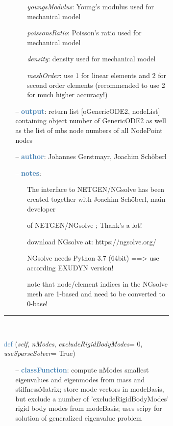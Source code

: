 \begin{itemize}[leftmargin=1.4cm]
\begin{itemize}[leftmargin=1.4cm]
\begin{itemize}[leftmargin=1.4cm]
\begin{itemize}[leftmargin=0.5cm]
\begin{itemize}[leftmargin=1.4cm]
\begin{itemize}[leftmargin=1.4cm]
\begin{itemize}[leftmargin=0.5cm]
\begin{itemize}[leftmargin=0.7cm]
\begin{itemize}[leftmargin=1.2cm]
\item[]{\it youngsModulus}: Young's modulus used for mechanical model
\item[]{\it poissonsRatio}: Poisson's ratio used for mechanical model
\item[]{\it density}: density used for mechanical model
\item[]{\it meshOrder}: use 1 for linear elements and 2 for second order elements (recommended to use 2 for much higher accuracy!)
\end{itemize}
\item[--]\textcolor{steelblue}{\bf output}: return list [oGenericODE2, nodeList] containing object number of GenericODE2 as well as the list of mbs node numbers of all NodePoint nodes
\item[--]\textcolor{steelblue}{\bf author}: Johannes Gerstmayr, Joachim Sch\"oberl
\item[--]\textcolor{steelblue}{\bf notes}: \vspace{-6pt}
\begin{itemize}[leftmargin=1.2cm]
\setlength{\itemindent}{-0.7cm}
\item[]The interface to NETGEN/NGsolve has been created together with Joachim Sch\"oberl, main developer
\item[]of NETGEN/NGsolve \cite{Schoeberl1997,NGsolve2014}; Thank's a lot!
\item[]download NGsolve at: https://ngsolve.org/
\item[]NGsolve needs Python 3.7 (64bit) ==> use according EXUDYN version!
\item[]note that node/element indices in the NGsolve mesh are 1-based and need to be converted to 0-base!
\end{itemize}
\vspace{12pt}\end{itemize}
%
\noindent\rule{8cm}{0.75pt}\vspace{1pt} \\ 
\begin{flushleft}
\noindent \textcolor{steelblue}{def {\bf {}}}\label{sec:FEM:FEMinterface:ComputeEigenmodes}
({\it self}, {\it nModes}, {\it excludeRigidBodyModes}= 0, {\it useSparseSolver}= True)
\end{flushleft}
\setlength{\itemindent}{0.7cm}
\begin{itemize}[leftmargin=0.7cm]
\item[--]\textcolor{steelblue}{\bf classFunction}: compute nModes smallest eigenvalues and eigenmodes from mass and stiffnessMatrix; store mode vectors in modeBasis, but exclude a number of 'excludeRigidBodyModes' rigid body modes from modeBasis; uses scipy for solution of generalized eigenvalue problem

\end{itemize}
\end{itemize}
\end{itemize}
\end{itemize}
\end{itemize}
\end{itemize}
\end{itemize}
\end{itemize}
